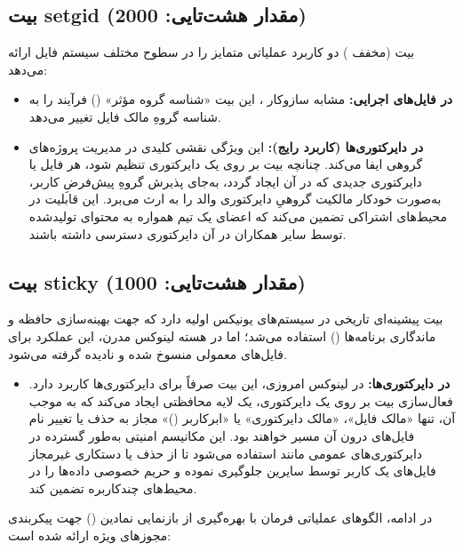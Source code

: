 \subsection*{بیت setgid (مقدار هشت‌تایی: 2000)}

بیت  (مخفف ) دو کاربرد عملیاتی متمایز را در سطوح مختلف سیستم فایل ارائه می‌دهد:

\begin{itemize}
  \item \textbf{در فایل‌های اجرایی:} مشابه سازوکار ، این بیت «شناسه گروه مؤثر» () فرآیند را به شناسه گروهِ مالک فایل تغییر می‌دهد.
  \item \textbf{در دایرکتوری‌ها (کاربرد رایج):} این ویژگی نقشی کلیدی در مدیریت پروژه‌های گروهی ایفا می‌کند. چنانچه بیت  بر روی یک دایرکتوری تنظیم شود، هر فایل یا دایرکتوری جدیدی که در آن ایجاد گردد، به‌جای پذیرش گروهِ پیش‌فرضِ کاربر، به‌صورت خودکار مالکیت گروهیِ دایرکتوری والد را به ارث می‌برد. این قابلیت در محیط‌های اشتراکی تضمین می‌کند که اعضای یک تیم همواره به محتوای تولیدشده توسط سایر همکاران در آن دایرکتوری دسترسی داشته باشند.
\end{itemize}

\subsection*{بیت sticky (مقدار هشت‌تایی: 1000)}

بیت  پیشینه‌ای تاریخی در سیستم‌های یونیکس اولیه دارد که جهت بهینه‌سازی حافظه و ماندگاری برنامه‌ها () استفاده می‌شد؛ اما در هسته لینوکس مدرن، این عملکرد برای فایل‌های معمولی منسوخ شده و نادیده گرفته می‌شود.

\begin{itemize}
  \item \textbf{در دایرکتوری‌ها:} در لینوکس امروزی، این بیت صرفاً برای دایرکتوری‌ها کاربرد دارد. فعال‌سازی بیت  بر روی یک دایرکتوری، یک لایه محافظتی ایجاد می‌کند که به موجب آن، تنها «مالک فایل»، «مالک دایرکتوری» یا «ابرکاربر ()» مجاز به حذف یا تغییر نام فایل‌های درون آن مسیر خواهند بود. این مکانیسم امنیتی به‌طور گسترده در دایرکتوری‌های عمومی مانند  استفاده می‌شود تا از حذف یا دستکاری غیرمجاز فایل‌های یک کاربر توسط سایرین جلوگیری نموده و حریم خصوصی داده‌ها را در محیط‌های چندکاربره تضمین کند.
\end{itemize}

در ادامه، الگوهای عملیاتی فرمان  با بهره‌گیری از بازنمایی نمادین () جهت پیکربندی مجوزهای ویژه ارائه شده است:

